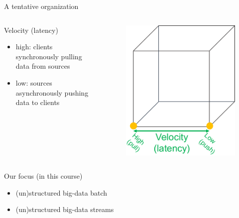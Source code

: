 \begin{frame}[allowframebreaks]{A tentative organization}
\begin{columns}
\begin{column}{0.5\textwidth}
Velocity (latency)
\begin{itemize}
\item high: clients synchronously pulling data from sources 
\item low: sources asynchronously pushing data to clients
\end{itemize}
\end{column}
\begin{column}{0.5\textwidth}
\begin{figure}
\centering
\includegraphics[scale=.4]{imgs/bigdatacube3.pdf}
\end{figure}
\end{column}
\end{columns}

\framebreak

\begin{columns}
\begin{column}{0.5\textwidth}
Our focus (in this course)
\begin{itemize}
\item (un)structured big-data batch
\item (un)structured big-data streams
\end{itemize}


\end{column}
\end{columns}
\end{frame}
